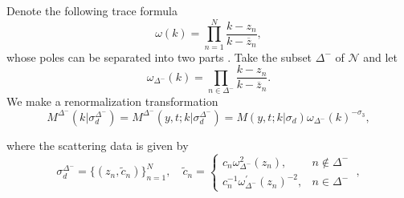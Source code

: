 \documentclass[11pt]{article}
\numberwithin{equation}{section}
\begin{document}
Denote the following trace formula
\begin{equation*}
    \omega(k) = \prod_{n=1}^N \frac{k - z_n}{k - \overline{z}_n},
\end{equation*}
whose poles can be separated into two parts . Take the subset $\Delta^-$ of $\mathcal{N}$ and let
\begin{equation*}
\omega_{\Delta^-}(k) = \prod_{n \in {\Delta^-}} \frac{k - z_n}{k - \overline{z}_n}.
\end{equation*}
We make a renormalization transformation
\begin{equation}\label{eq16}
M^{\Delta^-}(k|\sigma_d^{\Delta^-}) = M^{\Delta^-}( y, t;k|\sigma_d^{\Delta^-}) = M( y, t;k|\sigma_d) \omega_{\Delta^-}(k)^{-\sigma_3},
\end{equation}

where the scattering data is given by
\begin{equation}\label{eq15}
    \sigma_d^{\Delta^-} = \{(z_n, \tilde c_n)\}_{n=1}^N, \quad \tilde c_n = \begin{cases}
     c_n \omega^2_{\Delta^-}(z_n),&n\notin\Delta^-\\
        c_n^{-1} \omega_{\Delta^-}^{\prime}(z_n)^{-2},&n\in\Delta^-

    \end{cases}\;,
\end{equation}
\end{document}
